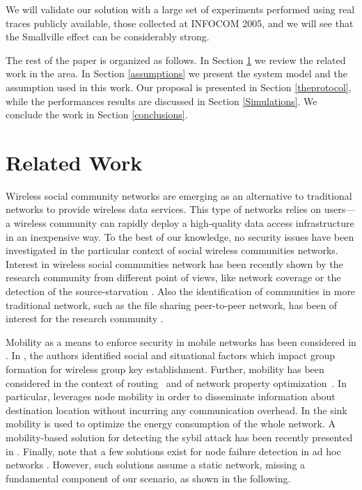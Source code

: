 \documentclass{IEEEconf}
\begin{document}
We will validate our solution with a large set of experiments performed using real traces
publicly available, those collected at INFOCOM 2005, and we
will see that the Smallville effect can be considerably strong.


The rest of the paper is organized as follows. In Section \ref{Related Work} we review the related work in the area. In Section \ref{assumptions} we present the system model and the assumption used in this work.
Our proposal is presented in Section \ref{theprotocol}, while the performances results are discussed in Section \ref{Simulations}. We conclude the work in Section \ref{conclusions}.








\section{Related Work}
\label{Related Work}
Wireless social community networks are emerging as an alternative to traditional networks to provide wireless data services. This type of networks relies on users---a wireless community can rapidly deploy a high-quality data access infrastructure in an inexpensive way.
To the best of our knowledge, no security issues have been investigated in the particular context of social wireless communities networks. Interest in wireless social communities network has been recently shown by the research community from different point of views, like network coverage \cite{SocialCommunitiesINFOCOM2008} or the detection of the source-starvation \cite{INFOCOM2008:starvation}. Also the identification of communities in more traditional network, such as the file sharing peer-to-peer network, has been of interest for the research community \cite{Small-worldFileSharing}.





Mobility as a means to enforce security in mobile networks has been considered in \cite{Capkun_Hubaux:MobilityHelpsSecurity:MobiHoc:2003}. In \cite{WiSec08:Perrig:MindYourManners}, the authors identified social and situational factors which
impact group formation for wireless group key establishment.
Further, mobility has been considered in the context
of routing~\cite{Grossglauser:humanspeed:INFOCOM2003} and of network property optimization~\cite{Hubaux:JointMobilityAndRouting:INFOCOM2005}. In particular, \cite{Grossglauser:humanspeed:INFOCOM2003} leverages node mobility in order to disseminate information about destination location without incurring any communication overhead. In \cite{Hubaux:JointMobilityAndRouting:INFOCOM2005} the sink mobility is used  to optimize the energy consumption of the whole network. A mobility-based solution for detecting the sybil attack has been recently presented in \cite{Piro:DetectingSybilInMobile_SecureComm2006}.
Finally, note that a few solutions exist for node failure detection in ad hoc networks \cite{HsinLiu:SelfMonitoring:2006, HsinLiu:ADistributedMonitoring:WISE02, Ranganathan:Gossip-Style:ClusterComputing:2001, Hay:Failure:SRDS02}. However, such solutions assume a static network, missing a fundamental component of our scenario, as shown in the following.
\end{document}
